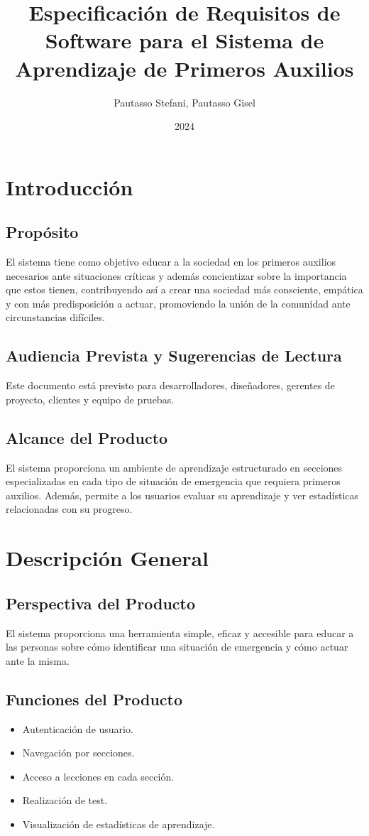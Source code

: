 \documentclass{article}
\title{Especificación de Requisitos de Software para el Sistema de Aprendizaje de Primeros Auxilios}
\author{Pautasso Stefani, Pautasso Gisel}
\date{2024}
\begin{document}
\maketitle

\section{Introducción}
    \subsection{Propósito}
        El sistema tiene como objetivo educar a la sociedad en los primeros auxilios necesarios ante
        situaciones críticas y además concientizar sobre la importancia que estos tienen, contribuyendo
        así a crear una sociedad más consciente, empática  y con más predisposición a actuar, promoviendo
        la unión de la comunidad ante circunstancias difíciles. 
    \subsection{Audiencia Prevista y Sugerencias de Lectura}
        Este documento está previsto para desarrolladores, diseñadores, gerentes de proyecto, clientes y equipo de pruebas.
    \subsection{Alcance del Producto}
        El sistema proporciona un ambiente de aprendizaje estructurado en secciones especializadas en cada tipo de situación de emergencia que requiera primeros auxilios. Además, permite a los usuarios evaluar su aprendizaje y ver estadísticas relacionadas con su progreso.

\section{Descripción General}
    \subsection{Perspectiva del Producto}
        El sistema proporciona una herramienta simple, eficaz y accesible para educar a las personas sobre cómo identificar una situación de emergencia y cómo actuar ante la misma.
    \subsection{Funciones del Producto}
        \begin{itemize}
            \item Autenticación de usuario.
            \item Navegación por secciones.
            \item Acceso a lecciones en cada sección.
            \item Realización de test.
            \item Visualización de estadísticas de aprendizaje.
        \end{itemize}
\end{document}
